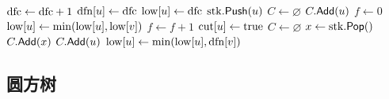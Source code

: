 \begin{algorithm}[H]
    \caption{点双连通分量（Tarjan）}
    \begin{algorithmic}[1]
            \State $\pvar{dfc} \gets \pvar{dfc} + 1$
            \State $\pvar{dfn}[u] \gets \pvar{dfc}$
            \State $\pvar{low}[u] \gets \pvar{dfc}$
            \State $\pvar{stk}.\Call{Push}{u}$
                \State $C \gets \varnothing$
                \State $C.\mathsf{Add}(u)$
                \State \Return
            \EndIf
            \State $f \gets 0$
                    \State {}
                    \State $\pvar{low}[u] \gets \min(\pvar{low}[u], \pvar{low}[v])$
                        \State $f \gets f + 1$
                            \State $\pvar{cut}[u] \gets \mathrm{true}$
                        \EndIf
                        \State $C \gets \varnothing$
                        \Repeat
                            \State $x \gets \pvar{stk}.\Call{Pop}{}$
                            \State $C.\mathsf{Add}(x)$
                        \State $C.\mathsf{Add}(u)$
                    \EndIf
                \Else
                    \State $\pvar{low}[u] \gets \min(\pvar{low}[u], \pvar{dfn}[v])$
                \EndIf
            \EndFor
        \EndProcedure
    \end{algorithmic}
\end{algorithm}

\subsection{圆方树}\label{sec:block-forest}

